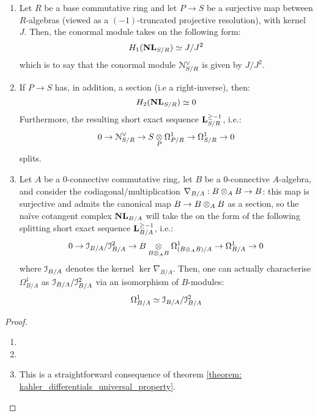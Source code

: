                 \begin{theorem} \label{theorem: computing_naive_cotangent_complexes}
                    \noindent
                    \begin{enumerate}
                        \item Let $R$ be a base commutative ring and let $P \to S$ be a surjective map between $R$-algebras (viewed as a $(-1)$-truncated projective resolution), with kernel $J$. Then, the conormal module takes on the following form:
                            $$H_1(\mathbf{NL}_{S/R}) \simeq J/J^2$$
                        which is to say that the conormal module $\mathcal{N}^{\vee}_{S/R}$ is given by $J/J^2$.
                        \item If $P \to S$ has, in addition, a section (i.e a right-inverse), then:
                            $$H_2(\mathbf{NL}_{S/R}) \simeq 0$$
                        Furthermore, the resulting short exact sequence $\mathbf{L}_{S/R}^{\geq -1}$, i.e.:
                            $$0 \to \calN^{\vee}_{S/R} \to S \tensor_P \Omega^1_{P/R} \to \Omega^1_{S/R} \to 0$$
                        splits.
                        \item Let $A$ be a $0$-connective commutative ring, let $B$ be a $0$-connective $A$-algebra, and consider the codiagonal/multiplication $\nabla_{B/A}: B \tensor_A B \to B$: this map is surjective and admits the canonical map $B \to B \tensor_A B$ as a section, so the na\"ive cotangent complex $\mathbf{NL}_{B/A}$ will take the on the form of the following splitting short exact sequence $\mathbf{L}_{B/A}^{\geq -1}$, i.e.:
                            $$0 \to \calI_{B/A}/\calI_{B/A}^2 \to B \tensor_{B \tensor_A B} \Omega^1_{(B \tensor_A B)/A} \to \Omega^1_{B/A} \to 0$$
                        where $\mathcal{I}_{B/A}$ denotes the kernel $\ker \nabla_{B/A}$. Then, one can actually characterise $\Omega^1_{B/A}$ as $\mathcal{I}_{B/A}/\mathcal{I}_{B/A}^2$ via an isomorphism of $B$-modules:
                            $$\Omega^1_{B/A} \simeq \mathcal{I}_{B/A}/\mathcal{I}_{B/A}^2$$
                    \end{enumerate}
                \end{theorem}
                    \begin{proof}
                        \noindent
                        \begin{enumerate}
                            \item 
                            \item 
                            \item This is a straightforward consequence of theorem \ref{theorem: kahler_differentials_universal_property}.
                        \end{enumerate}
                    \end{proof}
